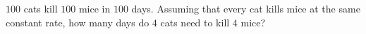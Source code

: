 $100$ cats kill $100$ mice in $100$ days. Assuming that every cat kills mice at the same constant rate, how many days do $4$ cats need to kill $4$ mice?
